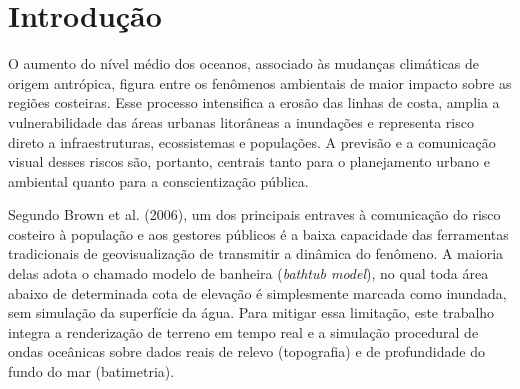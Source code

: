 \documentclass[conference]{IEEEtran}
\begin{document}
\begin{abstract}
\textit{Abstract}---This paper presents an interactive scientific
visualization system for analyzing coastal erosion and sea level rise
scenarios, built on a real Digital Elevation Model (DEM) of the Baixada
Santista region (Brazil). The data combine orbital radar observations and
bathymetry, that is, the depth of the seafloor. The goal was to determine
experimentally the geometric load beyond which the adaptive level of detail
technique CDLOD (Continuous Distance-Dependent Level of Detail) becomes
indispensable to keep the application interactive on the tested desktop GPU. The ocean surface was modeled with
six Gerstner waves, with a base height adjustable in real time, which
allows sea level rise scenarios of 0, +0.5, +1 and +2 meters to be
visualized. An automated windowless benchmark, run on an NVIDIA RTX 3060
graphics processing unit (GPU), compared rendering with and without level
of detail at five terrain resolutions. The results indicate a tipping point
between 2.7 and 4.2 million triangles, depending on the criterion (95th
percentile or mean), beyond which CDLOD becomes faster than the full mesh. It is concluded that adaptive level of detail is what
makes real-time three-dimensional visualization of coastal flooding
feasible.

Keywords: Scientific visualization. Level of detail. Terrain rendering.
Ocean simulation. Sea level rise.
\end{abstract}

\section{Introdução}
\label{sec:intro}

O aumento do nível médio dos oceanos, associado às mudanças climáticas de
origem antrópica, figura entre os fenômenos ambientais de maior impacto
sobre as regiões costeiras. Esse processo intensifica a erosão das linhas
de costa, amplia a vulnerabilidade das áreas urbanas litorâneas a
inundações e representa risco direto a infraestruturas, ecossistemas e
populações. A previsão e a comunicação visual desses riscos são, portanto,
centrais tanto para o planejamento urbano e ambiental quanto para a
conscientização pública.

Segundo Brown et al. (2006), um dos principais entraves à comunicação do
risco costeiro à população e aos gestores públicos é a baixa capacidade
das ferramentas tradicionais de geovisualização de transmitir a dinâmica
do fenômeno. A maioria delas adota o chamado modelo de banheira
(\emph{bathtub model}), no qual toda área abaixo de determinada cota de
elevação é simplesmente marcada como inundada, sem simulação da
superfície da água. Para mitigar essa limitação, este trabalho integra a
renderização de terreno em tempo real e a simulação procedural de ondas
oceânicas sobre dados reais de relevo (topografia) e de profundidade do
fundo do mar (batimetria).
\end{document}
